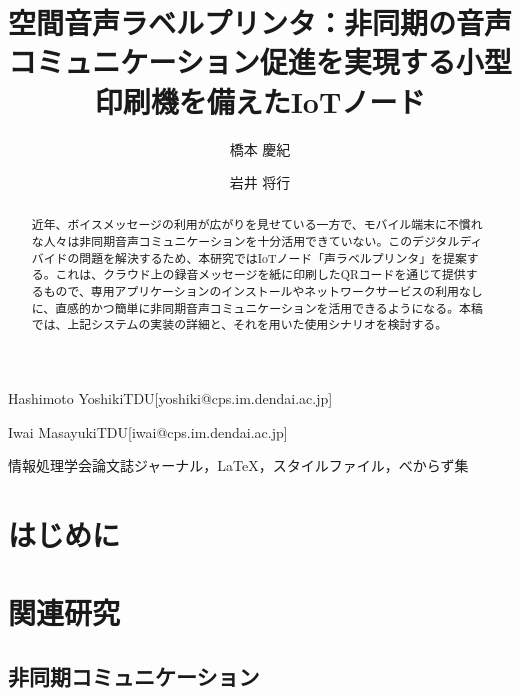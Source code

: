 \documentclass[submit,techrep,noauthor]{ipsj}
\def\|{\verb|}
\begin{document}
\title{空間音声ラベルプリンタ：非同期の音声コミュニケーション促進を実現する小型印刷機を備えたIoTノード}

\author{橋本 慶紀}{Hashimoto Yoshiki}{TDU}[yoshiki@cps.im.dendai.ac.jp]
\author{岩井 将行}{Iwai Masayuki}{TDU}[iwai@cps.im.dendai.ac.jp]

\begin{abstract}
近年、ボイスメッセージの利用が広がりを見せている一方で、モバイル端末に不慣れな人々は非同期音声コミュニケーションを十分活用できていない。このデジタルディバイドの問題を解決するため、本研究ではIoTノード「声ラベルプリンタ」を提案する。これは、クラウド上の録音メッセージを紙に印刷したQRコードを通じて提供するもので、専用アプリケーションのインストールやネットワークサービスの利用なしに、直感的かつ簡単に非同期音声コミュニケーションを活用できるようになる。本稿では、上記システムの実装の詳細と、それを用いた使用シナリオを検討する。
\cite{weko_70056_1}
\end{abstract}

\begin{jkeyword}
情報処理学会論文誌ジャーナル，\LaTeX，スタイルファイル，べからず集
\end{jkeyword}

\maketitle

%1
\section{はじめに}

% 論文フォーマットに関しては，\ref{sec:format}~章で後述する指針に従って頂くが，

%2
\section{関連研究}


% 2.1
\subsection{非同期コミュニケーション}

% 情報処理学会論文誌ジャーナルの\LaTeX スタイルファイルを含む論文執筆キットは
% \begin{quote}
% \small
% \|http://www.ipsj.or.jp/jip/submit/style.html|
\end{document}
